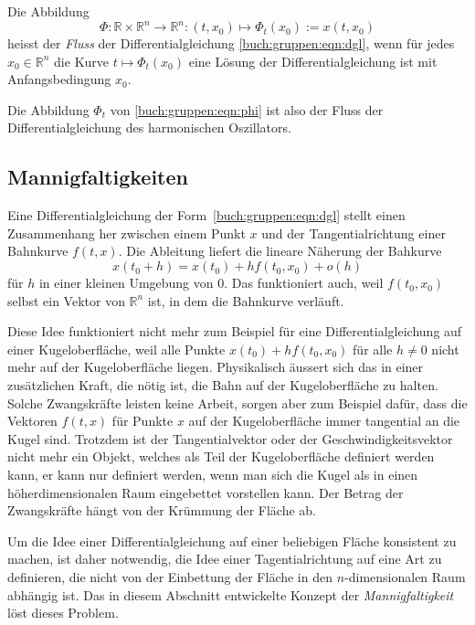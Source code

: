 \begin{definition}
Die Abbildung
\[
\Phi\colon \mathbb{R}\times\mathbb{R}^n\to\mathbb{R}^n
:
(t,x_0) \mapsto \Phi_t(x_0) := x(t,x_0)
\]
heisst der {\em Fluss} der Differentialgleichung
%
\eqref{buch:gruppen:eqn:dgl},
wenn für jedes $x_0\in\mathbb{R}^n$ die Kurve $t\mapsto \Phi_t(x_0)$
eine Lösung der Differentialgleichung ist mit Anfangsbedingung $x_0$.
\end{definition}

Die Abbildung $\Phi_t$ von \eqref{buch:gruppen:eqn:phi} ist also
der Fluss der Differentialgleichung des harmonischen Oszillators.

\subsection{Mannigfaltigkeiten
\label{buch:subsection:mannigfaltigkeit}}
Eine Differentialgleichung der Form~\eqref{buch:gruppen:eqn:dgl}
stellt einen Zusammenhang her zwischen einem Punkt $x$ und der
Tangentialrichtung einer Bahnkurve $f(t,x)$.
Die Ableitung liefert die lineare Näherung der Bahkurve
\[
x(t_0+h) = x(t_0) + h f(t_0,x_0) + o(h)
\]
für $h$ in einer kleinen Umgebung von $0$.
Das funktioniert auch, weil $f(t_0,x_0)$ selbst ein Vektor von
$\mathbb{R}^n$ ist, in dem die Bahnkurve verläuft.

Diese Idee funktioniert nicht mehr zum Beispiel für eine
Differentialgleichung auf einer Kugel\-oberfläche, weil alle Punkte
$x(t_0)+hf(t_0,x_0)$ für alle $h\ne 0$ nicht mehr auf der Kugeloberfläche
liegen.
Physikalisch äussert sich das in einer zusätzlichen Kraft, die nötig
ist, die Bahn auf der Kugeloberfläche zu halten.
Solche Zwangskräfte leisten keine Arbeit, sorgen aber zum Beispiel
dafür, dass die Vektoren $f(t,x)$ für
Punkte $x$ auf der Kugeloberfläche immer tangential an die Kugel sind.
Trotzdem ist der Tangentialvektor oder der Geschwindigkeitsvektor 
nicht mehr ein Objekt, welches als Teil der Kugeloberfläche definiert
werden kann, er kann nur definiert werden, wenn man sich die Kugel als
in einen höherdimensionalen Raum eingebettet vorstellen kann.
Der Betrag der Zwangskräfte hängt von der Krümmung der Fläche ab.

Um die Idee einer Differentialgleichung auf einer beliebigen Fläche
konsistent zu machen, ist daher notwendig, die Idee einer Tagentialrichtung
auf eine Art zu definieren, die nicht von der Einbettung der Fläche
in den $n$-dimensionalen Raum abhängig ist.
Das in diesem Abschnitt entwickelte Konzept der {\em Mannigfaltigkeit}
löst dieses Problem.
%


